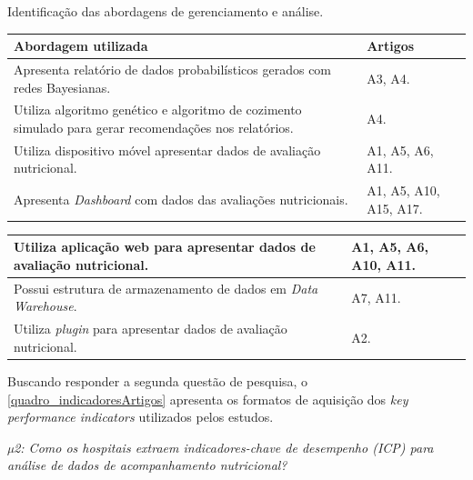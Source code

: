 \begin{quadro}[htb]
\caption{\label{quadro_funcionalidadesArtigos}Identificação das abordagens de gerenciamento e análise.}
\label{}
\begin{tabular}{|p{11cm}|p{4cm}|}
	\hline
	\textbf{Abordagem utilizada}   &   \textbf{Artigos}\\ \hline
	Apresenta relatório de dados probabilísticos gerados com redes Bayesianas.   &   A3, A4.\\ \hline
	Utiliza algoritmo genético e algoritmo de cozimento simulado para gerar recomendações nos relatórios.  &   A4.\\ \hline
	Utiliza dispositivo móvel apresentar dados de avaliação nutricional. & A1, A5, A6, A11.\\ \hline
	Apresenta \textit{Dashboard} com dados das avaliações nutricionais. & A1, A5, A10, A15, A17.\\ \hline
\end{tabular}
\end{quadro}

\begin{quadro}[htb]
\begin{tabular}{|p{11cm}|p{4cm}|}
    \hline
    Utiliza aplicação web para apresentar dados de avaliação nutricional. & A1, A5, A6, A10, A11.\\ \hline
	Possui estrutura de armazenamento de dados em\textit{ Data Warehouse}. & A7, A11.\\ \hline
	Utiliza \textit{plugin} para apresentar dados de avaliação nutricional.  & A2.\\ \hline
\end{tabular}
\end{quadro}

Buscando responder a segunda questão de pesquisa, o \autoref{quadro_indicadoresArtigos} apresenta os formatos de aquisição dos \textit{key performance indicators} utilizados pelos estudos.

\textit{µ2: Como os hospitais extraem indicadores-chave de desempenho (ICP) para análise de dados de acompanhamento nutricional?}

